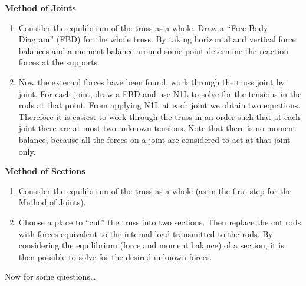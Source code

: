 {\bf Method of Joints}
\begin{enumerate}
 \item Consider the equilibrium of the truss as a whole. Draw a ``Free Body
   Diagram'' (FBD) for the whole truss. By taking horizontal and vertical
   force balances and a moment balance around some point determine the
   reaction forces at the supports.
 \item Now the external forces have been found, work through the truss joint
   by joint. For each joint, draw a FBD and use N1L to solve for the tensions
   in the rods at that point. From applying N1L at each joint we obtain two
   equations. Therefore it is easiest to work through the truss in an order
   such that at each joint there are at most two unknown tensions. Note that
   there is no moment balance, because all the forces on a joint are
   considered to act at that joint only.
\end{enumerate}

{\bf Method of Sections}
\begin{enumerate}
 \item Consider the equilibrium of the truss as a whole (as in the first step
   for the Method of Joints).
 \item Choose a place to ``cut'' the truss into two sections. Then replace the
   cut rods with forces equivalent to the internal load transmitted to the
   rods. By considering the equilibrium (force and moment balance) of a
   section, it is then possible to solve for the desired unknown forces.
\end{enumerate}

Now for some questions\dots\clearpage
